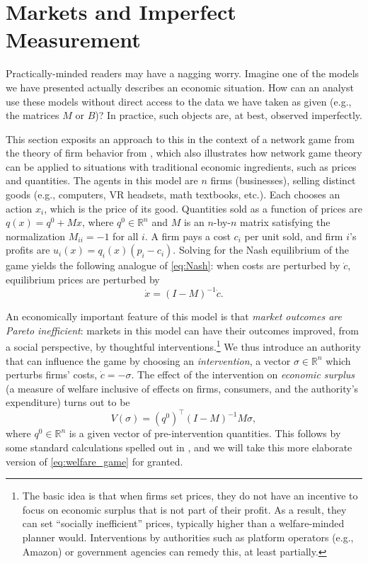 \documentclass{notices}
\theoremstyle{definition}\newtheorem{problem}{Problem}
\begin{document}
\section*{Markets and Imperfect Measurement}

Practically-minded readers may have a nagging worry. Imagine one of the models we have presented actually describes an economic situation. How can an analyst use these models without direct access to the data we have taken as given (e.g., the matrices $M$ or $B$)? In practice, such objects are, at best, observed imperfectly. 

This section exposits an approach to this in the context of a network game from the theory of firm behavior from \cite{GaleottiGolubGoyalTalamasTamuz2024}, which also illustrates how network game theory can be applied to situations with traditional economic ingredients, such as prices and quantities. The agents in this model are \( n \) firms (businesses), selling distinct goods  (e.g., computers, VR headsets, math textbooks, etc.).  Each chooses an action $x_i$, which is the price of its good. Quantities sold as a function of prices are $q(x)=q^0+Mx$, where $q^0 \in \mathbb{R}^n$ and $M$ is an $n$-by-$n$ matrix satisfying the normalization $M_{ii}=-1$ for all $i$. A firm pays a cost $c_i$ per unit sold, and firm $i$'s profits are $ u_i(x) = q_i(x)(p_i-c_i).$ Solving for the Nash equilibrium of the game yields the following analogue of \cref{eq:Nash}: when costs are perturbed by $\dot{c}$, equilibrium prices are perturbed by $$ \dot{x} = (I-M)^{-1} \dot{c}.$$ 

An economically important feature of this model is that \emph{market outcomes are Pareto inefficient}: markets in this model can have their outcomes improved, from a social perspective, by thoughtful interventions.\footnote{The basic idea is that when firms set prices, they do not have an incentive to focus on economic surplus that is not part of their profit. As a result, they can set ``socially inefficient'' prices, typically higher than a welfare-minded planner would. Interventions by authorities such as platform operators (e.g., Amazon) or government agencies can remedy this, at least partially.} We thus introduce an authority that can influence the game by choosing an \emph{intervention}, a vector \( \sigma \in \mathbb{R}^n \) which perturbs firms' costs, $\dot{c}=-\sigma$.  The effect of the intervention on \emph{economic surplus} (a measure of welfare inclusive of effects on firms, consumers, and the authority's expenditure) turns out to be
\begin{equation}
V(\sigma) = (q^0)^\top (I - M)^{-1} M \sigma, \label{eq:welfare_market}
\end{equation} where $q^0 \in \mathbb{R}^n$ is a given vector of pre-intervention quantities. This follows by some standard calculations spelled out in \cite{GaleottiGolubGoyalTalamasTamuz2024}, and we will take this more elaborate version of \cref{eq:welfare_game} for granted.
\end{document}
